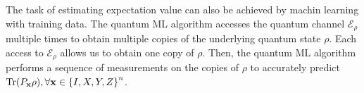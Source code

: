 \documentclass[
reprint,
aps,
pra,
floatfix,
]{revtex4-2}
\theoremstyle{plain}
\newtheorem{theorem}{Theorem}
\newtheorem{proposition}{Proposition}
\theoremstyle{definition}
\newtheorem{definition}{Definition}
\newcommand{\dm}{\rho}
\newcommand{\shadow}{\textup{shadow}}
\begin{document}



The task of estimating expectation value can also be achieved by machin learning with training data.
The quantum ML algorithm accesses the quantum channel $\mathcal{E}_\dm$ multiple times to obtain multiple copies of the underlying quantum state $\dm$. Each access to $\mathcal{E}_\dm$ allows us to obtain one copy of $\dm$. Then, the quantum ML algorithm performs a sequence of measurements on the copies of $\dm$ to accurately predict $\Tr(P_{\vbx} \dm ), \forall \vbx \in \qty{ I, X, Y, Z }^n$.
\end{document}
